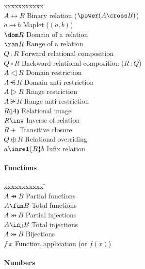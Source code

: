 \documentclass{article}
\begin{document}
\begin{tabbing}
xxxxxxxxxxx \= \kill \\ 
$A \rel B$ \> Binary relation ($\power (A \cross B)$) \\
$a \mapsto b$ \> Maplet ($(a,b)$) \\
$\dom R$ \> Domain of a relation \\
$\ran R$ \> Range of a relation \\
$Q \comp R$ \> Forward relational composition \\
$Q \circ R$ \> Backward relational composition ($R \comp Q$) \\
$A \dres R$ \> Domain restriction \\
$A \ndres R$ \> Domain anti-restriction \\
$A \rres R$ \> Range restriction \\
$A \nrres R$ \> Range anti-restriction \\
$R \limg A \rimg$ \> Relational image \\
$R \inv$ \> Inverse of relation \\
$R \plus$ \> Transitive closure \\
$Q \oplus R$ \> Relational overriding \\
$a \inrel{R} b$ \> Infix relation \\
\end{tabbing}

\paragraph{Functions}

\begin{tabbing}
xxxxxxxxxxx \= \kill \\ 
$A \pfun B$ \> Partial functions \\
$A \fun B$ \> Total functions \\
$A \pinj B$ \> Partial injections \\
$A \inj B$ \> Total injections \\
$A \bij B$ \> Bijections \\
$f~x$ \> Function application (or $f(x)$) \\
\end{tabbing}

\paragraph{Numbers}
\end{document}
